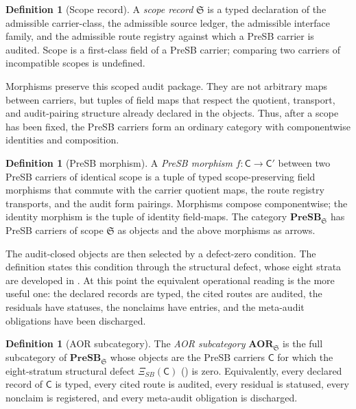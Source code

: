 \documentclass[11pt]{article}
\newcommand{\PreSB}{\mathbf{PreSB}}
\newcommand{\AOR}{\mathbf{AOR}}
\newcommand{\XiSB}{\Xi_{SB}}
\theoremstyle{definition}
\newtheorem{definition}[theorem]{Definition}
\begin{document}
\begin{definition}[Scope record]\label{def:aor:scope-record}
A \emph{scope record} $\mathfrak S$ is a typed declaration of the
admissible carrier-class, the admissible source ledger, the admissible
interface family, and the admissible route registry against which a
PreSB carrier is audited.  Scope is a first-class field of a PreSB
carrier; comparing two carriers of incompatible scopes is undefined.
\end{definition}

Morphisms preserve this scoped audit package.  They are not arbitrary maps
between carriers, but tuples of field maps that respect the quotient,
transport, and audit-pairing structure already declared in the objects.
Thus, after a scope has been fixed, the PreSB carriers form an ordinary
category with componentwise identities and composition.

\begin{definition}[PreSB morphism]\label{def:aor:morphism-presb}
A \emph{PreSB morphism} $f:\mathsf C\to\mathsf C'$ between two PreSB
carriers of identical scope is a tuple of typed scope-preserving
field morphisms that commute with the carrier quotient maps, the route
registry transports, and the audit form pairings.  Morphisms compose
componentwise; the identity morphism is the tuple of identity
field-maps.  The category $\PreSB_{\mathfrak S}$ has PreSB carriers of
scope $\mathfrak S$ as objects and the above morphisms as arrows.
\end{definition}

The audit-closed objects are then selected by a defect-zero
condition.  The definition states this condition through the
structural defect, whose eight strata are developed in
.  At this point the equivalent
operational reading is the more useful one: the declared records are
typed, the cited routes are audited, the residuals have statuses, the
nonclaims have entries, and the meta-audit obligations have been
discharged.

\begin{definition}[AOR subcategory]\label{def:aor:aor-subcategory}
The \emph{AOR subcategory} $\AOR_{\mathfrak S}$ is the full
subcategory of $\PreSB_{\mathfrak S}$ whose objects are the PreSB
carriers $\mathsf C$ for which the eight-stratum structural defect
$\XiSB(\mathsf C)$ () is zero.  Equivalently, every
declared record of $\mathsf C$ is typed, every cited route is audited,
every residual is statused, every nonclaim is registered, and every
meta-audit obligation is discharged.
\end{definition}
\end{document}
